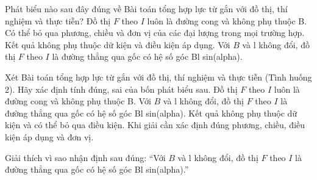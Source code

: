 \begin{ex}
Phát biểu nào sau đây đúng về Bài toán tổng hợp lực từ gắn với đồ thị, thí nghiệm và thực tiễn?
\choice
{Đồ thị $F$ theo $I$ luôn là đường cong và không phụ thuộc B.}
{Có thể bỏ qua phương, chiều và đơn vị của các đại lượng trong mọi trường hợp.}
{Kết quả không phụ thuộc dữ kiện và điều kiện áp dụng.}
{\True Với $B$ và l không đổi, đồ thị $F$ theo $I$ là đường thẳng qua gốc có hệ số góc Bl sin(alpha).}
\end{ex}

\begin{ex}
Xét Bài toán tổng hợp lực từ gắn với đồ thị, thí nghiệm và thực tiễn (Tình huống 2). Hãy xác định tính đúng, sai của bốn phát biểu sau.
\choiceTF
{Đồ thị $F$ theo $I$ luôn là đường cong và không phụ thuộc B.}
{\True Với $B$ và l không đổi, đồ thị $F$ theo $I$ là đường thẳng qua gốc có hệ số góc Bl sin(alpha).}
{Kết quả không phụ thuộc dữ kiện và có thể bỏ qua điều kiện.}
{\True Khi giải cần xác định đúng phương, chiều, điều kiện áp dụng và đơn vị.}
\end{ex}

\begin{bt}
Giải thích vì sao nhận định sau đúng: “Với $B$ và l không đổi, đồ thị $F$ theo $I$ là đường thẳng qua gốc có hệ số góc Bl sin(alpha).”
\end{bt}

